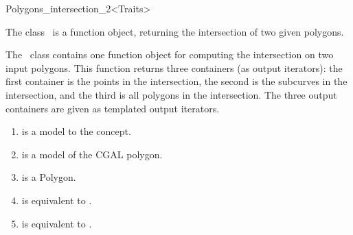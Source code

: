 
\ccRefPageBegin



\begin{ccRefFunctionObjectClass}{Polygons_intersection_2<Traits>}
\label{OVL_sec:polygon_intersection}
    
\ccDefinition
The class \ccClassTemplateName\ is a function object,
returning the intersection of two given polygons.


  

The \ccClassTemplateName\ class contains one function
object for computing the intersection on two input polygons.
This function returns three containers (as output iterators):
the first container is the points in the intersection, 
the second is the subcurves in the intersection,
and the third is all polygons in the intersection.
The three output containers are given as templated 
output iterators.


\begin{enumerate}
   \item
    is a model to the  concept.
   \item
    is a model of the CGAL polygon.
   \item
    is a Polygon.
   \item    
    is equivalent to .
   \item
    is equivalent to .
\end{enumerate}


\end{ccRefFunctionObjectClass}
